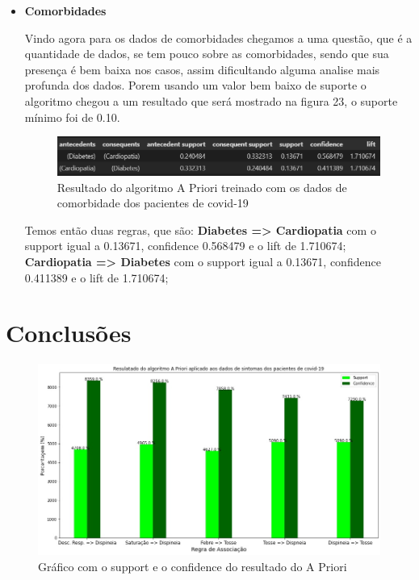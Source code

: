 \documentclass[tcc1]{uftex}
\begin{document}
\begin{itemize}
   \item\textbf{Comorbidades}
   
   Vindo agora para os dados de comorbidades chegamos a uma questão, que é a quantidade de dados, se tem pouco sobre as comorbidades, sendo que sua presença é bem baixa nos casos, assim dificultando alguma analise mais profunda dos dados. Porem usando um valor bem baixo de suporte o algoritmo chegou a um resultado que será mostrado na figura 23, o suporte mínimo foi de 0.10.
   
   \begin{figure}[!h]
    \centering
    \includegraphics[width=14cm]{resultado_apriori_comorbidade.png} %
    \caption{Resultado do algoritmo A Priori treinado com os dados de comorbidade dos pacientes de covid-19}
    \end{figure}
   
   Temos então duas regras, que são:
   \textbf{Diabetes => Cardiopatia} com o support igual a 0.13671, confidence 0.568479 e o lift de 1.710674;
    \textbf{Cardiopatia => Diabetes} com o support igual a 0.13671, confidence 0.411389 e o lift de 1.710674; 
   
 \end{itemize}

\chapter{Conclusões}
    \begin{figure}[!h]
    \centering
    \includegraphics[width=14cm]{AprioriIMG.jpg}
    \caption{Gráfico com o support e o confidence do resultado do A Priori}
    \end{figure}
\end{document}
